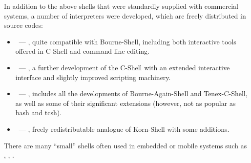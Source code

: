 In addition to the above shells that were standardly supplied with
commercial systems, a number of interpreters were developed,
which are freely distributed in source codes:
\begin{itemize}
\item {}~--- , quite compatible with
      Bourne-Shell, including both interactive tools offered in C-Shell and
      command line editing.
\item {}~--- , a further development of
      the C-Shell with an extended interactive interface and slightly improved
      scripting machinery.
\item {}~--- , includes all the developments of Bourne-Again-Shell
      and Tenex-C-Shell, as well as some of their significant extensions
      (however, not as popular as bash and tcsh).
\item {}~--- , freely redistributable
      analogue of Korn-Shell with some additions.
\end{itemize}

There are many ``small'' shells often used in embedded or mobile systems
such as , , .

